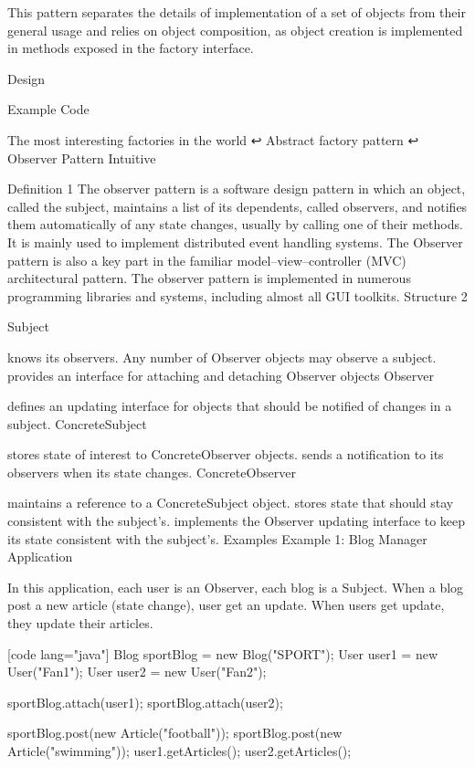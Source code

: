 This pattern separates the details of implementation of a set of objects from their general usage and relies on object composition, as object creation is implemented in methods exposed in the factory interface.

Design


Example Code


The most interesting factories in the world ↩
Abstract factory pattern ↩
Observer Pattern
Intuitive



Definition 1
The observer pattern is a software design pattern in which an object, called the subject, maintains a list of its dependents, called observers, and notifies them automatically of any state changes, usually by calling one of their methods. It is mainly used to implement distributed event handling systems. The Observer pattern is also a key part in the familiar model–view–controller (MVC) architectural pattern. The observer pattern is implemented in numerous programming libraries and systems, including almost all GUI toolkits.
Structure 2


Subject

knows its observers. Any number of Observer objects may observe a subject.
provides an interface for attaching and detaching Observer objects
Observer

defines an updating interface for objects that should be notified of changes in a subject.
ConcreteSubject

stores state of interest to ConcreteObserver objects.
sends a notification to its observers when its state changes.
ConcreteObserver

maintains a reference to a ConcreteSubject object.
stores state that should stay consistent with the subject's.
implements the Observer updating interface to keep its state consistent with the subject's.
Examples
Example 1: Blog Manager Application

In this application, each user is an Observer, each blog is a Subject. When a blog post a new article (state change), user get an update. When users get update, they update their articles.

[code lang="java"] Blog sportBlog = new Blog("SPORT"); User user1 = new User("Fan1"); User user2 = new User("Fan2");

sportBlog.attach(user1); sportBlog.attach(user2);

sportBlog.post(new Article("football")); sportBlog.post(new Article("swimming")); user1.getArticles(); user2.getArticles();

